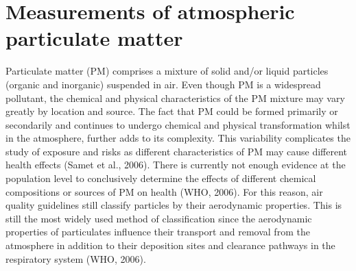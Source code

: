 \documentclass{nwureport}
\begin{document}
\section{Measurements of atmospheric particulate matter}

Particulate matter (PM) comprises a mixture of solid and/or liquid particles (organic and inorganic) suspended in air. Even though PM is a widespread pollutant, the chemical and physical characteristics of the PM mixture may vary greatly by location and source. The fact that PM could be formed primarily or secondarily and continues to undergo chemical and physical transformation whilst in the atmosphere, further adds to its complexity. This variability complicates the study of exposure and risks as different characteristics of PM may cause different health effects (Samet et al., 2006). There is currently not enough evidence at the population level to conclusively determine the effects of different chemical compositions or sources of PM on health (WHO, 2006). For this reason, air quality guidelines still classify particles by their aerodynamic properties. This is still the most widely used method of classification since the aerodynamic properties of particulates influence their transport and removal from the atmosphere in addition to their deposition sites and clearance pathways in the respiratory system (WHO, 2006).
\end{document}
